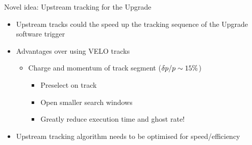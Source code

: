 \documentclass[aspectratio=1610]{beamer}
\begin{document}
\begin{frame}{Novel idea: Upstream tracking for the Upgrade}
\begin{itemize}
  \item Upstream tracks could the speed up the tracking sequence of the Upgrade software trigger
  \item Advantages over using VELO tracks
    \begin{itemize}
      \item Charge and momentum of track segment ($\delta \mbox{$p$}/\mbox{$p$} \sim 15 \%$)
      \begin{itemize}
        \item[\ding{212}] Preselect on track \pt
        \item[\ding{212}] Open smaller search windows
        \item[\ding{72}] Greatly reduce execution time and ghost rate!
      \end{itemize}
    \end{itemize}
  \end{itemize}

  \begin{center}
  
  \end{center}

  \begin{itemize}
  \item Upstream tracking algorithm needs to be optimised for speed/efficiency
  \end{itemize}
\end{frame}
\end{document}
